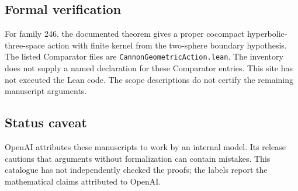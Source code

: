 \documentclass[11pt]{article}
\begin{document}
\subsection{Formal verification}
For family 246, the documented theorem gives a proper cocompact hyperbolic-three-space action with finite kernel from the two-sphere boundary hypothesis. The listed Comparator files are \texttt{CannonGeometricAction.lean}. The inventory does not supply a named declaration for these Comparator entries. This site has not executed the Lean code. The scope descriptions do not certify the remaining manuscript arguments.

\subsection{Status caveat}
OpenAI attributes these manuscripts to work by an internal model. Its release cautions that arguments without formalization can contain mistakes. This catalogue has not independently checked the proofs; the labels report the mathematical claims attributed to OpenAI.
\end{document}
